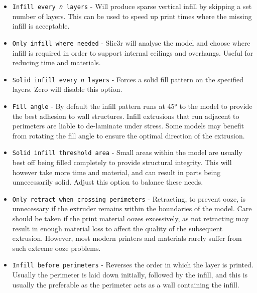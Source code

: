 \begin{itemize}
    \item \texttt{Infill every \textit{n} layers} - Will produce sparse vertical infill by skipping a set number of layers. This can be used to speed up print times where the missing infill is acceptable.
    \item \texttt{Only infill where needed} - Slic3r will analyse the model and choose where infill is required in order to support internal ceilings and overhangs.  Useful for reducing time and materials.
    \item \texttt{Solid infill every \textit{n} layers} - Forces a solid fill pattern on the specified layers.  Zero will disable this option.
    \item \texttt{Fill angle} - By default the infill pattern runs at 45° to the model to provide the best adhesion to wall structures.  Infill extrusions that run adjacent to perimeters are liable to de-laminate under stress.  Some models may benefit from rotating the fill angle to ensure the optimal direction of the extrusion.
    \item \texttt{Solid infill threshold area} - Small areas within the model are usually best off being filled completely to provide structural integrity.  This will however take more time and material, and can result in parts being unnecessarily solid.  Adjust this option to balance these needs.
    \item \texttt{Only retract when crossing perimeters} - Retracting, to prevent ooze, is unnecessary if the extruder remains within the boundaries of the model.  Care should be taken if the print material oozes excessively, as not retracting may result in enough material loss to affect the quality of the subsequent extrusion.  However, most modern printers and materials rarely suffer from such extreme ooze problems.
    \item \texttt{Infill before perimeters} - Reverses the order in which the layer is printed. Usually the perimeter is laid down initially, followed by the infill, and this is usually the preferable as the perimeter acts as a wall containing the infill.
\end{itemize}


